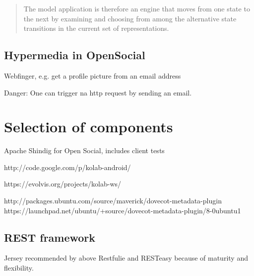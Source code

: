 \documentclass[12pt,a4paper]{scrartcl}		%
\begin{document}


\begin{quotation}
  The model application is therefore an engine that moves from one state to the next by examining and choosing from among the alternative state transitions in the current set of representations.
\end{quotation}\cite[sec. 5.3, p.103]{Fielding2000}

\subsection{Hypermedia in OpenSocial}

Webfinger, e.g. get a profile picture from an email address

Danger: One can trigger na http request by sending an email.

\section{Selection of components}

Apache Shindig for Open Social, includes client tests

http://code.google.com/p/kolab-android/

https://evolvis.org/projects/kolab-ws/

http://packages.ubuntu.com/source/maverick/dovecot-metadata-plugin
https://launchpad.net/ubuntu/+source/dovecot-metadata-plugin/8-0ubuntu1



\subsection{REST framework}
Jersey recommended by \cite{Kaiser2011} above Restfulie and RESTeasy because of maturity and flexibility.
\end{document}
